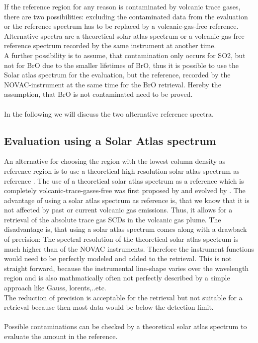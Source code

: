 If the reference region for any reason is
contaminated by volcanic trace gases, there are two possibilities: excluding the contaminated data from the evaluation or the reference spectrum has to be
replaced by a volcanic-gas-free reference. Alternative spectra are a
theoretical solar atlas spectrum or a volcanic-gas-free reference
spectrum recorded by the same instrument at another time.\\
A further possibility is to assume, that contamination only occurs for SO2, but not for BrO due to the smaller lifetimes of BrO, thus it is possible to use the Solar atlas spectrum for the  evaluation, but the reference, recorded by the NOVAC-instrument at the same time for the BrO retrieval. Hereby the assumption, that BrO is not contaminated need to be proved. \\
%
\\
%
In the following we will discuss the two alternative reference spectra.
%
\subsection*{Evaluation using a Solar Atlas spectrum \label{kuruz}}
An alternative for choosing the region with the lowest column density as reference region is to use a theoretical high resolution solar atlas spectrum as reference \citep{chance2010improved}.
The use of a theoretical solar atlas spectrum as a reference which is completely volcanic-trace-gases-free was first proposed by \cite{salerno2009novel} and evolved by \citep{lubcke2014bro}.
The advantage of using a solar atlas spectrum as reference is, that we know that it is not affected by past or current volcanic gas emissions. Thus, it allows for a retrieval of the absolute trace gas SCDs in the volcanic gas plume. The disadvantage is, that using a solar atlas spectrum comes along with a drawback of precision: The spectral resolution of the theoretical solar atlas spectrum is much  higher than of the NOVAC instruments. Therefore the instrument functions would need to be perfectly modeled and added to the retrieval. This is not straight forward, because the instrumental line-shape varies over the wavelength region and is also mathmatically often not perfectly described by a simple approach like Gauss, lorents,..etc.\\ 
The reduction of precision is acceptable for the
 retrieval but not suitable for a  retrieval because then most data would be below the detection limit.\\
%
\\
%
Possible contaminations can be checked
by a theoretical solar atlas spectrum to evaluate the  amount in the reference.\\

